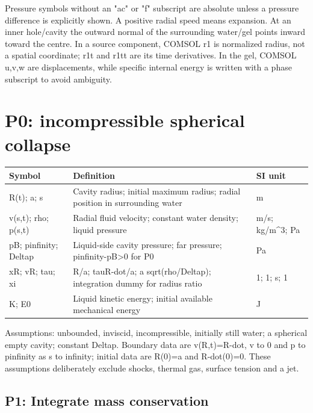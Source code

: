 \documentclass[11pt]{article}
\begin{document}
Pressure symbols without an "ac" or "f" subscript are absolute unless a pressure difference is explicitly shown. A positive radial speed means expansion. At an inner hole/cavity the outward normal of the surrounding water/gel points inward toward the centre. In a source component, COMSOL r1 is normalized radius, not a spatial coordinate; r1t and r1tt are its time derivatives. In the gel, COMSOL u,v,w are displacements, while specific internal energy is written with a phase subscript to avoid ambiguity.

\section{P0: incompressible spherical collapse}\label{sec:p0}

\begin{longtable}{p{.18\linewidth}p{.60\linewidth}p{.15\linewidth}}Symbol & Definition & SI unit\\\hline

R(t); a; s & Cavity radius; initial maximum radius; radial position in surrounding water & m\\

v(s,t); rho; p(s,t) & Radial fluid velocity; constant water density; liquid pressure & m/s; kg/m\textasciicircum{}3; Pa\\

pB; pinfinity; Deltap & Liquid-side cavity pressure; far pressure; pinfinity-pB\textgreater{}0 for P0 & Pa\\

xR; vR; tau; xi & R/a; tauR-dot/a; a sqrt(rho/Deltap); integration dummy for radius ratio & 1; 1; s; 1\\

K; E0 & Liquid kinetic energy; initial available mechanical energy & J\\

\end{longtable}

Assumptions: unbounded, inviscid, incompressible, initially still water; a spherical empty cavity; constant Deltap. Boundary data are v(R,t)=R-dot, v to 0 and p to pinfinity as s to infinity; initial data are R(0)=a and R-dot(0)=0. These assumptions deliberately exclude shocks, thermal gas, surface tension and a jet.

\subsection{P1: Integrate mass conservation}
\end{document}
